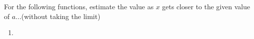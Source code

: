 \documentclass{ximera}
\author{Elizabeth Campolongo}
\begin{document}
\begin{exercise}
For the following functions, estimate the value as $x$ gets closer to the given value of $a$...(without taking the limit)
%
\begin{enumerate}

\item 

\end{enumerate}

\end{exercise}
\end{document}
